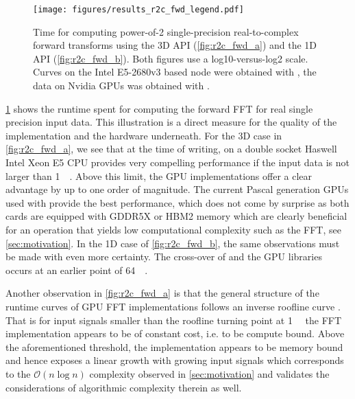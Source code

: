 \begin{figure}[!tbp]
  \centering
  \texttt{[image: figures/results\_r2c\_fwd\_legend.pdf]}\vspace{-1em}
  \hfill
  \caption{Time for computing power-of-2 single-precision real-to-complex forward transforms using the 3D API (\cref{fig:r2c_fwd_a}) and the 1D API \clfft{} (\cref{fig:r2c_fwd_b}). Both figures use a log10-versus-log2 scale. Curves on the Intel E5-2680v3 based node were obtained with \fftw{}, the data on Nvidia GPUs was obtained with \cufft{}.}
  \label{fig:r2c_fwd}
\end{figure}

\cref{fig:r2c_fwd} shows the runtime spent for computing the forward FFT for real single precision input data. This illustration is a direct measure for the quality of the implementation and the hardware underneath. For the 3D case in \cref{fig:r2c_fwd_a}, we see that at the time of writing, \fftw{} on a double socket Haswell Intel Xeon E5 CPU provides very compelling performance if the input data is not larger than \SI{1}{\mebi\byte}. Above this limit, the GPU implementations offer a clear advantage by up to one order of magnitude. The current Pascal generation GPUs used with \cufft{} provide the best performance, which does not come by surprise as both cards are equipped with GDDR5X or HBM2 memory which are clearly beneficial for an operation that yields low computational complexity such as the FFT, see \cref{sec:motivation}. In the 1D case of \cref{fig:r2c_fwd_b}, the same observations must be made with even more certainty. The cross-over of \fftw{} and the GPU libraries occurs at an earlier point of \SI{64}{\kibi\byte}.  

Another observation in \cref{fig:r2c_fwd_a} is that the general structure of the runtime curves of GPU FFT implementations follows an inverse roofline curve \cite{williams2009roofline}. That is for input signals smaller than the roofline turning point at \SI{1}{\mebi\byte} the FFT implementation appears to be of constant cost, i.e. to be compute bound. Above the aforementioned threshold, the implementation appears to be memory bound and hence exposes a linear growth with growing input signals which corresponds to the $\mathcal{O}(n \log n)$ complexity observed in \cref{sec:motivation} and validates the considerations of algorithmic complexity therein as well. 

